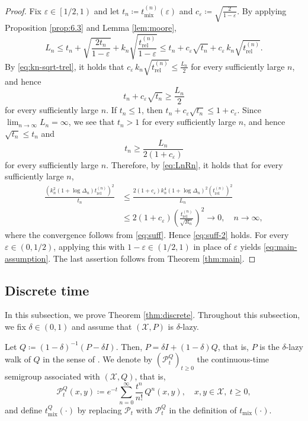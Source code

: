 \documentclass[a4paper, reqno, 11pt]{amsart}
\theoremstyle{definition}
\begin{document}
\begin{proof}
Fix $\varepsilon \in \left[1/2, 1\right)$ and let $t_n \coloneqq t_{\mathrm{mix}}^{(n)}(\varepsilon)$ and $c_{\varepsilon} \coloneqq \sqrt{\frac{2}{1-\varepsilon}}$.
By applying Proposition \ref{prop:6.3} and Lemma \ref{lem:moore},
\[ L_n \le t_n + \sqrt{\frac{2t_n}{1-\varepsilon}} + k_n \sqrt{\frac{t_{\mathrm{rel}}^{(n)}}{1-\varepsilon}} \le t_n + c_{\varepsilon}\sqrt{t_n} + c_{\varepsilon}\,k_n \sqrt{t_{\mathrm{rel}}^{(n)}}. \]
By \eqref{eq:kn-sqrt-trel}, it holds that $c_{\varepsilon}\,k_n \sqrt{t_{\mathrm{rel}}^{(n)}} \le \frac{L_n}{2}$ for every sufficiently large $n$, and hence
\[ t_n + c_{\varepsilon}\sqrt{t_n} \ge \frac{L_n}{2} \]
for every sufficiently large $n$.
If $t_n \le 1$, then $t_n + c_{\varepsilon}\sqrt{t_n} \le 1 + c_{\varepsilon}$.
Since $\lim_{n \to \infty} L_n = \infty$, we see that $t_n > 1$ for every sufficiently large $n$,
and hence $\sqrt{t_n} \le t_n$ and
\[ t_n \ge \frac{L_n}{2\left(1 + c_{\varepsilon}\right)} \]
for every sufficiently large $n$.
Therefore, by \eqref{eq:LnRn}, it holds that for every sufficiently large $n$,
\begin{align*} \frac{\left(k_n^{2}\left(1+\log \Delta_n\right) t_{\mathrm{rel}}^{(n)}\right)^{2}}{t_n}
&\le \frac{2\left(1 + c_{\varepsilon}\right) k_n^{4}\left(1+\log \Delta_n\right)^{2} \left(t_{\mathrm{rel}}^{(n)}\right)^{2}}{L_n} \\
&\le 2\left(1 + c_{\varepsilon}\right) \left(\frac{t_{\mathrm{rel}}^{(n)}}{\sqrt{R_n}}\right)^{2} \to 0, \quad n \to \infty, 
\end{align*}
where the convergence follows from \eqref{eq:suff}.
Hence \eqref{eq:suff-2} holds. 
For every $\varepsilon \in \left(0,1/2\right)$, applying this with $1-\varepsilon \in \left(1/2,1\right)$ in place of $\varepsilon$ yields \eqref{eq:main-assumption}.
The last assertion follows from Theorem \ref{thm:main}.
\end{proof}

\subsection{Discrete time}\label{subsec:discrete}

In this subsection, we prove Theorem \ref{thm:discrete}.
Throughout this subsection, we fix $\delta \in \left(0,1\right)$ and assume that $(\mathcal{X}, P)$ is $\delta$-lazy.

Let $Q \coloneqq (1-\delta)^{-1} (P - \delta I)$.
Then, $P = \delta I + (1-\delta) Q$,
that is, $P$ is the $\delta$-lazy walk of $Q$ in the sense of \cite{CSC2013}.
We denote by $(\mathscr{P}_t^{Q})_{t \ge 0}$ the continuous-time semigroup associated with $(\mathcal{X}, Q)$, that is,
\[ \mathscr{P}_t^{Q} (x,y) \coloneqq e^{-t} \sum_{n=0}^{\infty} \frac{t^n}{n!} \, Q^n (x,y), \quad x,y \in \mathcal{X},\ t \ge 0, \]
and define $t_{\mathrm{mix}}^{Q}(\cdot)$ by replacing $\mathscr{P}_t$ with $\mathscr{P}_t^{Q}$ in the definition of $t_{\mathrm{mix}}(\cdot)$.
\end{document}
